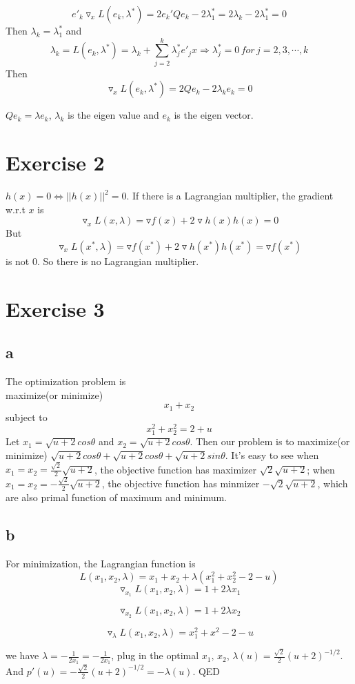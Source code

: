 \documentclass[12pt,a4paper]{article}
\begin{document}
\[
e'_k\triangledown_xL(e_k,\lambda^*)=2e_k'Qe_k-2\lambda^*_1=2\lambda_k-2\lambda^*_1=0
\]
Then $\lambda_k=\lambda^*_1$ and \[
\lambda_k=L(e_k,\lambda^*)=\lambda_k+\sum_{j=2}^{k}\lambda_j^*e'_jx
\Rightarrow \lambda^*_j=0\, for\, j=2,3,\cdots,k\]
Then
\[
\triangledown_xL(e_k,\lambda^*)=2Qe_k-2\lambda_ke_k=0
\]

$Qe_k=\lambda e_k$, $\lambda_k$ is the eigen value and $e_k$ is the eigen vector.
\section*{Exercise 2}
$h(x)=0\Leftrightarrow||h(x)||^2=0$. If there is a Lagrangian multiplier, the gradient w.r.t $x$ is \[
\triangledown_x L(x,\lambda)=\triangledown f(x) + 2\triangledown h(x)h(x)=0
\]
But
\[
\triangledown_x L(x^*,\lambda)=\triangledown f(x^*) + 2\triangledown h(x^*)h(x^*)=\triangledown f(x^*)
\] is not 0. So there is no Lagrangian multiplier.
\section*{Exercise 3}
\subsection*{a}
The optimization problem is \\
maximize(or minimize)
\[
x_1+x_2
\]
subject to\[
x_1^2+x_2^2=2+u
\]
Let $x_1=\sqrt{u+2}cos\theta$ and $x_2=\sqrt{u+2}cos\theta$. Then our problem is to maximize(or minimize) $\sqrt{u+2}cos\theta+\sqrt{u+2}cos\theta+\sqrt{u+2}sin\theta$.
It's easy to see when $x_1=x_2=\frac{\sqrt{2}}{2}\sqrt{u+2}$, the objective function has maximizer $\sqrt{2}\sqrt{u+2}$; when $x_1=x_2=-\frac{\sqrt{2}}{2}\sqrt{u+2}$, the objective function has minmizer $-\sqrt{2}\sqrt{u+2}$, which are also primal function of maximum and minimum.

\subsection*{b}
For minimization, the Lagrangian function is \[
L(x_1,x_2,\lambda)=x_1 + x_2 + \lambda(x_1^2+x_2^2-2-u)
\]
\[
\triangledown_{x_1}L(x_1,x_2,\lambda)=1 + 2 \lambda x_1
\]

\[
\triangledown_{x_2}L(x_1,x_2,\lambda)=1 + 2 \lambda x_2
\]

\[
\triangledown_{\lambda}L(x_1,x_2,\lambda)= x_1^2+x^2-2-u
\]

we have $\lambda=-\frac{1}{2x_1}=-\frac{1}{2x_1}$, plug in the optimal $x_1,\, x_2$, $\lambda(u)=\frac{\sqrt{2}}{2}(u+2)^{-1/2}$. And $p'(u)=-\frac{\sqrt{2}}{2}(u+2)^{-1/2}=-\lambda(u)$. QED
\end{document}
